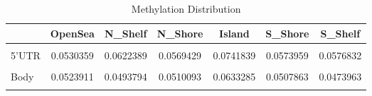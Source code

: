 \documentclass[
  10pt,
]{article}
\begin{document}
\begin{table}

\caption{\label{tab:Methylation Distribution}Methylation Distribution}
\centering
\begin{tabular}[t]{lcccccc}
\toprule
  & OpenSea & N\_Shelf & N\_Shore & Island & S\_Shore & S\_Shelf\\
\midrule
\cellcolor{gray!6}{Promoter} & \cellcolor{gray!6}{0.1164621} & \cellcolor{gray!6}{0.1029990} & \cellcolor{gray!6}{0.1242210} & \cellcolor{gray!6}{0.1460420} & \cellcolor{gray!6}{0.1156378} & \cellcolor{gray!6}{0.1037933}\\
5'UTR & 0.0530359 & 0.0622389 & 0.0569429 & 0.0741839 & 0.0573959 & 0.0576832\\
\cellcolor{gray!6}{1stExon} & \cellcolor{gray!6}{0.0588488} & \cellcolor{gray!6}{0.0489130} & \cellcolor{gray!6}{0.0623833} & \cellcolor{gray!6}{0.0746424} & \cellcolor{gray!6}{0.0625000} & \cellcolor{gray!6}{0.0370370}\\
Body & 0.0523911 & 0.0493794 & 0.0510093 & 0.0633285 & 0.0507863 & 0.0473963\\
\cellcolor{gray!6}{3'UTR} & \cellcolor{gray!6}{0.0485610} & \cellcolor{gray!6}{0.0415879} & \cellcolor{gray!6}{0.0554833} & \cellcolor{gray!6}{0.0638298} & \cellcolor{gray!6}{0.0563931} & \cellcolor{gray!6}{0.0479303}\\
\bottomrule
\end{tabular}
\end{table}
\end{document}
